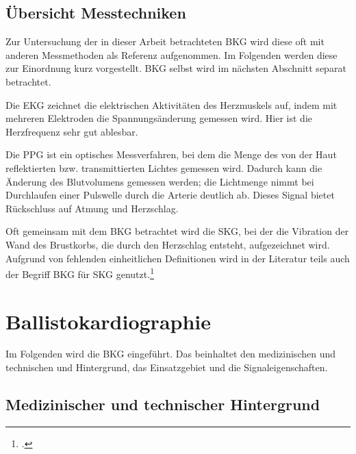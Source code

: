 	\subsection{Übersicht Messtechniken}
	
	Zur Untersuchung der in dieser Arbeit betrachteten \acf{BKG} wird diese oft mit anderen Messmethoden als Referenz aufgenommen. Im Folgenden werden diese zur Einordnung kurz vorgestellt. \ac{BKG} selbst wird im nächsten Abschnitt separat betrachtet.
	
	Die \acf{EKG} zeichnet die elektrischen Aktivitäten des Herzmuskels auf, indem mit mehreren Elektroden die Spannungsänderung gemessen wird. Hier ist die Herzfrequenz sehr gut ablesbar.
	
	Die \acf{PPG} ist ein optisches Messverfahren, bei dem die Menge des von der Haut reflektierten bzw. transmittierten Lichtes gemessen wird. Dadurch kann die Änderung des Blutvolumens gemessen werden; die Lichtmenge nimmt bei Durchlaufen einer Pulswelle durch die Arterie deutlich ab. Dieses Signal bietet Rückschluss auf Atmung und Herzschlag. %
	
	Oft gemeinsam mit dem \ac{BKG} betrachtet wird die \acf{SKG}, bei der die Vibration der Wand des Brustkorbs, die durch den Herzschlag entsteht, aufgezeichnet wird. Aufgrund von fehlenden einheitlichen Definitionen wird in der Literatur teils auch der Begriff \ac{BKG} für \ac{SKG} genutzt.\footcite[Vgl.][]{Inan2015}

	\section{Ballistokardiographie}\label{ballistokardiographie}
	
	Im Folgenden wird die \acl{BKG} eingeführt. Das beinhaltet den medizinischen und technischen und Hintergrund, das Einsatzgebiet und die Signaleigenschaften.
	
	\subsection{Medizinischer und technischer Hintergrund}
	
